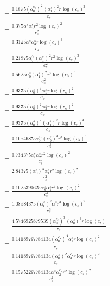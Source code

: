 \documentclass[10pt]{article}
\begin{document}
\begin{align*}
&{}  + \frac{0.1875 \left(\alpha_{0}^{c_s}\right)^{2} \left(\alpha_{1}^s\right)^{2} r \log{\left(c_{s} \right)}^{3}}{c_{s}} \\
&{}  + \frac{0.375 \alpha_{0}^s \alpha_{3}^s r^{2} \log{\left(c_{s} \right)}^{2}}{c_{s}^{2}} \\
&{}  + \frac{0.3125 \alpha_{1}^s \alpha_{3}^s r \log{\left(c_{s} \right)}^{3}}{c_{s}} \\
&{}  + \frac{0.21875 \alpha_{0}^{c_s} \left(\alpha_{1}^s\right)^{2} r^{2} \log{\left(c_{s} \right)}^{3}}{c_{s}^{2}} \\
&{}  + \frac{0.5625 \alpha_{0}^s \left(\alpha_{1}^s\right)^{2} r^{2} \log{\left(c_{s} \right)}^{3}}{c_{s}^{2}} \\
&{}  + \frac{0.9375 \left(\alpha_{0}^s\right)^{4} \alpha_{1}^s r \log{\left(c_{s} \right)}^{2}}{c_{s}} \\
&{}  + \frac{0.9375 \left(\alpha_{0}^s\right)^{2} \alpha_{3}^s r \log{\left(c_{s} \right)}^{2}}{c_{s}} \\
&{}  + \frac{0.9375 \left(\alpha_{0}^s\right)^{2} \left(\alpha_{1}^s\right)^{2} r \log{\left(c_{s} \right)}^{3}}{c_{s}} \\
&{}  + \frac{0.10546875 \alpha_{0}^{c_s} \left(\alpha_{0}^s\right)^{3} r^{3} \log{\left(c_{s} \right)}^{3}}{c_{s}^{3}} \\
&{}  + \frac{0.734375 \alpha_{1}^s \alpha_{2}^s r^{2} \log{\left(c_{s} \right)}^{2}}{c_{s}^{2}} \\
&{}  + \frac{2.84375 \left(\alpha_{0}^s\right)^{3} \alpha_{1}^s r^{2} \log{\left(c_{s} \right)}^{2}}{c_{s}^{2}} \\
&{}  + \frac{0.1025390625 \alpha_{0}^s \alpha_{1}^s r^{4} \log{\left(c_{s} \right)}^{2}}{c_{s}^{4}} \\
&{}  + \frac{1.08984375 \left(\alpha_{0}^s\right)^{2} \alpha_{1}^s r^{3} \log{\left(c_{s} \right)}^{2}}{c_{s}^{3}} \\
&{}  + \frac{4.5746925879539 \left(\alpha_{0}^{c_s}\right)^{3} \left(\alpha_{0}^s\right)^{3} r \log{\left(c_{s} \right)}}{c_{s}} \\
&{}  + \frac{0.14189767784134 \left(\alpha_{0}^{c_s}\right)^{4} \alpha_{1}^s r \log{\left(c_{s} \right)}^{2}}{c_{s}} \\
&{}  + \frac{0.14189767784134 \left(\alpha_{0}^s\right)^{2} \alpha_{3}^{c_s} r \log{\left(c_{s} \right)}^{2}}{c_{s}} \\
&{}  + \frac{0.15752267784134 \alpha_{1}^s \alpha_{2}^{c_s} r^{2} \log{\left(c_{s} \right)}^{2}}{c_{s}^{2}} \\

\end{align*}
\end{document}
